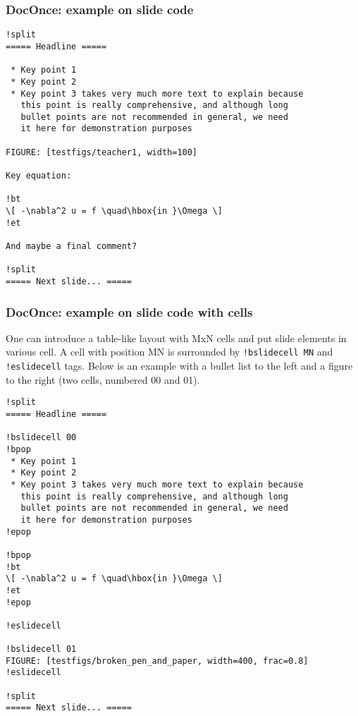 \documentclass{beamer}
\begin{document}
\begin{frame}
\frametitle{DocOnce: example on slide code}

\begin{verbatim}
!split
===== Headline =====

 * Key point 1
 * Key point 2
 * Key point 3 takes very much more text to explain because
   this point is really comprehensive, and although long
   bullet points are not recommended in general, we need
   it here for demonstration purposes

FIGURE: [testfigs/teacher1, width=100]

Key equation:

!bt
\[ -\nabla^2 u = f \quad\hbox{in }\Omega \]
!et

And maybe a final comment?

!split
===== Next slide... =====

\end{verbatim}
\end{frame}

\begin{frame}
\frametitle{DocOnce: example on slide code with cells}

One can introduce a table-like layout with MxN cells and
put slide elements in various cell. A cell with position
MN is surrounded by \Verb?!bslidecell MN? and \Verb?!eslidecell?
tags. Below is an example with a bullet list to the left and
a figure to the right (two cells, numbered 00 and 01).





























\begin{verbatim}
!split
===== Headline =====

!bslidecell 00
!bpop
 * Key point 1
 * Key point 2
 * Key point 3 takes very much more text to explain because
   this point is really comprehensive, and although long
   bullet points are not recommended in general, we need
   it here for demonstration purposes
!epop

!bpop
!bt
\[ -\nabla^2 u = f \quad\hbox{in }\Omega \]
!et
!epop

!eslidecell

!bslidecell 01
FIGURE: [testfigs/broken_pen_and_paper, width=400, frac=0.8]
!eslidecell

!split
===== Next slide... =====

\end{verbatim}
\end{frame}
\end{document}
